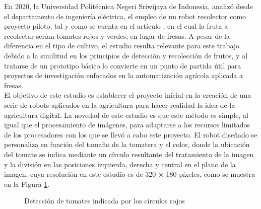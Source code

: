 En 2020, la Universidad Politécnica Negeri Sriwijaya de Indonesia, analizó desde el departamento de ingeniería eléctrica, el empleo de un robot recolector como proyecto piloto, tal y como se cuenta en el artículo \cite{Oktarina20}, en el cual la fruta a recolectar serían tomates rojos y verdes, en lugar de fresas. A pesar de la diferencia en el tipo de cultivo, el estudio resulta relevante para este trabajo debido a la similitud en los principios de detección y recolección de frutos, y al tratarse de un prototipo básico lo convierte en un punto de partida útil para proyectos de investigación enfocados en la automatización agrícola aplicada a fresas.\\

El objetivo de este estudio es establecer el proyecto inicial en la creación de una serie de robots aplicados en la agricultura para hacer realidad la idea de la agricultura digital. La novedad de este estudio es que este método es simple, al igual que el procesamiento de imágenes, para adaptarse a los recursos limitados de los procesadores con los que se llevó a cabo este proyecto. El robot diseñado se personaliza en función del tamaño de la tomatera y el color, donde la ubicación del tomate se indica mediante un círculo resultante del tratamiento de la imagen y la división en las posiciones izquierda, derecha y central en el plano de la imagen, cuya resolución en este estudio es de 320 × 180 píxeles, como se muestra en la Figura \ref{fig:Deteccion_tomates}. 

\begin{figure}[H]
    \begin{center}
      \subcapcentertrue
      \hspace{2mm}
    \end{center}
    \caption{Detección de tomates indicada por los círculos rojos}
    \label{fig:Deteccion_tomates}
  \end{figure}

